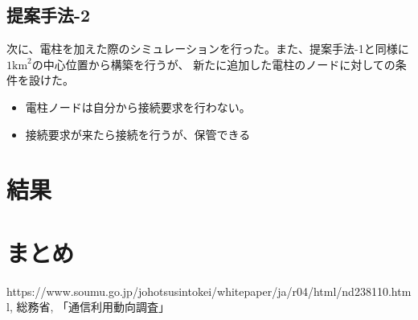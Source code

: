 \documentclass[a4paper, 10pt]{ltjsarticle}
\begin{document}
\subsection{提案手法-2}
次に、電柱を加えた際のシミュレーションを行った。また、提案手法-1と同様に$1\mathrm{km}^2$の中心位置から構築を行うが、
新たに追加した電柱のノードに対しての条件を設けた。
\begin{itemize}
  \item 電柱ノードは自分から接続要求を行わない。
  \item 接続要求が来たら接続を行うが、保管できる
\end{itemize}

\section{結果}

\section{まとめ}

\begin{thebibliography}{9}
   https://www.soumu.go.jp/johotsusintokei/whitepaper/ja/r04/html/nd238110.html, 総務省, 「通信利用動向調査」 
\end{thebibliography}
\end{document}
